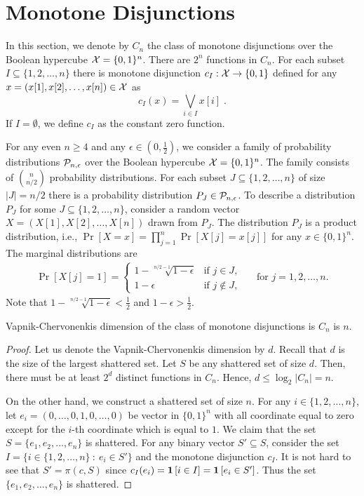 \section{Monotone Disjunctions}
\label{section:monotone-dijsunctions}

In this section, we denote by $C_n$ the class of monotone disjunctions over the
Boolean hypercube $\X = \{0,1\}^n$. There are $2^n$ functions in $C_n$. For each
subset $I \subseteq \{1,2,\dots,n\}$ there is monotone disjunction $c_I:\X \to
\{0,1\}$ defined for any $x = (x[1],
x[2], \dots, x[n]) \in \X$ as
$$
c_I(x) = \bigvee_{i \in I} x[i] \; .
$$
If $I = \emptyset$, we define $c_I$ as the constant zero function.

For any even $n \ge 4$ and any $\epsilon \in (0,\frac{1}{2})$, we consider a
family of probability distributions $\P_{n,\epsilon}$ over the Boolean hypercube $\X =
\{0,1\}^n$. The family consists of $\binom{n}{n/2}$ probability distributions.
For each subset $J \subseteq \{1,2,\dots,n\}$ of size $|J| = n/2$
there is a probability distribution $P_J \in \P_{n,\epsilon}$. To describe a distribution $P_J$
for some $J \subseteq \{1,2,\dots,n\}$, consider a random vector $X = (X[1],
X[2], \dots, X[n])$ drawn from $P_J$. The distribution $P_J$ is a product
distribution, i.e., $\Pr[X=x] = \prod_{j=1}^n \Pr[X[j] = x[j]]$ for any $x \in
\{0,1\}^n$. The marginal distributions are
\begin{align*}
\Pr[X[j] = 1] =
\begin{cases}
1 - \sqrt[n/2 - 1]{1 - \epsilon}  & \text{if $j \in J$,} \\
1 - \epsilon & \text{if $j \not \in J$,}
\end{cases}
&& \text{for $j=1,2,\dots,n$.}
\end{align*}
Note that $1 - \sqrt[n/2-1]{1 - \epsilon} < \frac{1}{2}$ and $1 - \epsilon > \frac{1}{2}$.

\begin{proposition}
Vapnik-Chervonenkis dimension of the class of monotone disjunctions is $C_n$ is $n$.
\end{proposition}

\begin{proof}
Let us denote the Vapnik-Chervonenkis dimension by $d$. Recall that $d$ is the
size of the largest shattered set. Let $S$ be any shattered set of size $d$.
Then, there must be at least $2^d$ distinct functions in $C_n$. Hence, $d \le
\log_2 |C_n| = n$.

On the other hand, we construct a shattered set of size $n$. For any $i \in
\{1,2,\dots,n\}$, let $e_i = (0, \dots, 0, 1, 0, \dots, 0)$ be vector in
$\{0,1\}^n$ with all coordinate equal to zero except for the $i$-th coordinate
which is equal to $1$. We claim that the set $S = \{e_1, e_2, \dots, e_n\}$ is
shattered. For any binary vector $S' \subseteq S$, consider the set $I = \{ i
\in \{1,2,\dots,n\} ~:~ e_i \in S' \}$ and the monotone disjunction $c_I$. It is
not hard to see that $S' = \pi(c, S)$ since $c_I(e_i) = \indicator{i \in I} =
\indicator{e_i \in S'}$. Thus the set $\{e_1, e_2, \dots, e_n\}$ is shattered.
\end{proof}

